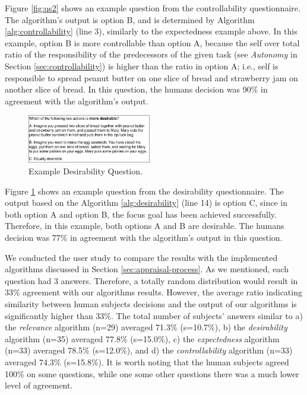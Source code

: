 \documentclass{article}
\begin{document}
Figure \ref{fig:qs2} shows an example question from the controllability
questionnaire. The algorithm's output is option B, and is determined by
Algorithm \ref{alg:controllability} (line 3), similarly to the expectedness
example above. In this example, option B is more controllable than option A,
because the self over total ratio of the responsibility of the predecessors of
the given task (see \textit{Autonomy} in Section \ref{sec:controllability}) is
higher than the ratio in option A; i.e., self is responsible to spread peanut
butter on one slice of bread and strawberry jam on another slice of bread. In
this question, the humans decision was 90\% in agreement with the algorithm's
output.

\begin{figure}[tbh]
  \vspace{-1mm}
  \centering
  \includegraphics[width=0.48\textwidth]{figure/question-sample3-croped.pdf}
  \vspace*{-7mm}
  \caption{{\fontsize{9}{9}\selectfont Example Desirability Question.}}
  \label{fig:qs3}
  \vspace{-2mm}
\end{figure}

Figure \ref{fig:qs3} shows an example question from the desirability
questionnaire. The output based on the Algorithm \ref{alg:desirability}
(line 14) is option C, since in both option A and option B, the focus goal
has been achieved successfully. Therefore, in this example, both options A and B
are desirable. The humans decision was 77\% in agreement with the algorithm's
output in this question.

We conducted the user study to compare the results with the implemented
algorithms discussed in Section \ref{sec:appraisal-process}. As we mentioned,
each question had 3 answers. Therefore, a totally random distribution would
result in 33\% agreement with our algorithms results. However, the average
ratio indicating similarity between human subjects decisions and the output of
our algorithms is significantly higher than 33\%. The total number of subjects'
answers similar to a) the \textit{relevance} algorithm (n=29) averaged 71.3\%
(s=10.7\%), b) the \textit{desirability} algorithm (n=35) averaged 77.8\%
(s=15.0\%), c) the \textit{expectedness} algorithm (n=33) averaged 78.5\%
(s=12.0\%), and d) the \textit{controllability} algorithm (n=33) averaged 74.3\%
(s=15.8\%). It is worth noting that the human subjects agreed 100\% on some
questions, while one some other questions there was a much lower level of
agreement.
\end{document}
